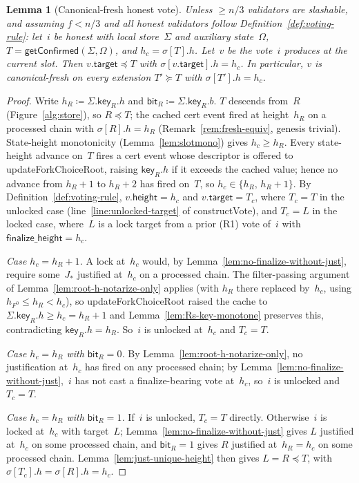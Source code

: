 \documentclass{article}
\newcommand{\target}{\mathsf{target}}
\newcommand{\height}{\mathsf{height}}
\newcommand{\finalizeHeight}{\mathsf{finalize\_height}}
\newcommand{\key}{\mathsf{key}}
\newcommand{\bit}{\mathsf{bit}}
\newcommand{\constructVote}{\textsf{constructVote}\xspace}
\newcommand{\updateForkChoiceRoot}{\textsf{updateForkChoiceRoot}\xspace}
\newcommand{\getConfirmed}{\textsf{getConfirmed}\xspace}
\theoremstyle{plain}
\newtheorem{lemma}{Lemma}
\theoremstyle{definition}
\theoremstyle{remark}
\begin{document}
\begin{lemma}[Canonical-fresh honest vote]\label{lem:canonical-fresh-honest-vote}
Unless $\geq n/3$ validators are slashable, and assuming $f < n/3$ and all honest validators follow Definition~\ref{def:voting-rule}: let~$i$ be honest with local store~$\Sigma$ and auxiliary state~$\Omega$, $T = \getConfirmed(\Sigma, \Omega)$, and $h_c = \sigma[T].h$.
Let~$v$ be the vote~$i$ produces at the current slot.
Then $v.\target \preceq T$ with $\sigma[v.\target].h = h_c$.
In particular, $v$ is canonical-fresh on every extension $T' \succeq T$ with $\sigma[T'].h = h_c$.
\end{lemma}

\begin{proof}
Write $h_R \coloneqq \Sigma.\key_R.h$ and $\bit_R \coloneqq \Sigma.\key_R.b$.
$T$ descends from~$R$ (Figure~\ref{alg:store}), so $R \preceq T$; the cached cert event fired at height~$h_R$ on a processed chain with $\sigma[R].h = h_R$ (Remark~\ref{rem:fresh-equiv}, genesis trivial).
State-height monotonicity (Lemma~\ref{lem:slotmono}) gives $h_c \geq h_R$.
Every state-height advance on~$T$ fires a cert event whose descriptor is offered to \updateForkChoiceRoot, raising $\key_R.h$ if it exceeds the cached value; hence no advance from $h_R + 1$ to $h_R + 2$ has fired on~$T$, so $h_c \in \{h_R,\, h_R + 1\}$.
By Definition~\ref{def:voting-rule}, $v.\height = h_c$ and $v.\target = T_c$, where $T_c = T$ in the unlocked case (line~\ref{line:unlocked-target} of \constructVote{}), and $T_c = L$ in the locked case, where~$L$ is a lock target from a prior (R1) vote of~$i$ with $\finalizeHeight = h_c$.

\emph{Case $h_c = h_R + 1$.}
A lock at~$h_c$ would, by Lemma~\ref{lem:no-finalize-without-just}, require some~$J_\ast$ justified at~$h_c$ on a processed chain.
The filter-passing argument of Lemma~\ref{lem:root-h-notarize-only} applies (with $h_R$ there replaced by~$h_c$, using $h_{F^0} \leq h_R < h_c$), so \updateForkChoiceRoot raised the cache to $\Sigma.\key_R.h \geq h_c = h_R + 1$ and Lemma~\ref{lem:Rs-key-monotone} preserves this, contradicting $\key_R.h = h_R$.
So~$i$ is unlocked at~$h_c$ and $T_c = T$.

\emph{Case $h_c = h_R$ with $\bit_R = 0$.}
By Lemma~\ref{lem:root-h-notarize-only}, no justification at~$h_c$ has fired on any processed chain; by Lemma~\ref{lem:no-finalize-without-just},~$i$ has not cast a finalize-bearing vote at~$h_c$, so~$i$ is unlocked and $T_c = T$.

\emph{Case $h_c = h_R$ with $\bit_R = 1$.}
If~$i$ is unlocked, $T_c = T$ directly.
Otherwise~$i$ is locked at~$h_c$ with target~$L$; Lemma~\ref{lem:no-finalize-without-just} gives $L$ justified at~$h_c$ on some processed chain, and $\bit_R = 1$ gives $R$ justified at~$h_R = h_c$ on some processed chain.
Lemma~\ref{lem:just-unique-height} then gives $L = R \preceq T$, with $\sigma[T_c].h = \sigma[R].h = h_c$.
\end{proof}
\end{document}
